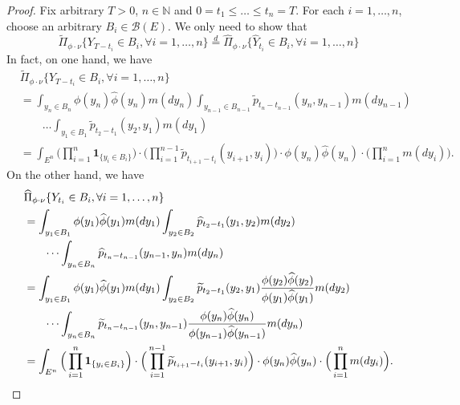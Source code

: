 \documentclass[12pt,a4paper]{amsart}
\numberwithin{equation}{section}
\theoremstyle{plain}
\theoremstyle{definition}
\begin{document}
\begin{proof}
	Fix arbitrary $T>0$, $n \in \mathbb N$ and $0= t_1\leq \dots \leq t_n = T$.
	For each $i=1,\dots, n$, choose an arbitrary $B_i \in \mathscr B(E)$.
	We only need to show that
  \[
    \widetilde \Pi_{\phi \cdot \nu}\{Y_{T-t_i}\in B_i,\forall i=1,\dots, n\}
    \overset{d}{=}\widehat \Pi_{\phi \cdot \nu}\{\widehat Y_{t_i}\in B_i,\forall i=1,\dots, n\}
  \]
	In fact, on one hand, we have
  \begin{align}
    &\widetilde \Pi_{\phi \cdot \nu}\{Y_{T-t_i}\in B_i,\forall i=1,\dots, n\}
    \\&= \int_{y_n\in B_n} \phi(y_n)\widehat\phi(y_n) m(dy_n)\int_{y_{n-1}\in B_{n-1}} \widetilde p_{t_n - t_{n-1}}(y_n,y_{n-1})m(dy_{n-1})
    \\& \qquad \dots \int_{y_1\in B_1} \widetilde p_{t_2 - t_1}(y_2,y_1)m(dy_1)
    \\&= \int_{E^n} \Big(\prod_{i=1}^n \mathbf 1_{\{y_i\in B_i\}}\Big)\cdot\Big(\prod_{i=1}^{n-1} \widetilde p_{t_{i+1}-t_i}(y_{i+1},y_i)\Big)\cdot\phi(y_n)\widehat\phi(y_n)\cdot \Big(\prod_{i=1}^nm(dy_i)\Big).
  \end{align}
	On the other hand, we have
  \begin{align}
    &\widehat \Pi_{\phi\cdot\nu}\{Y_{t_i}\in B_i, \forall i = 1,\dots, n\}
    \\&= \int_{y_1\in B_1} \phi(y_1)\widehat \phi(y_1)m(dy_1) \int_{y_2\in B_2} \widehat p_{t_2-t_1}(y_1,y_2)m(dy_2)
    \\&\qquad \dots\int_{y_n\in B_n}\widehat p_{t_n-t_{n-1}}(y_{n-1},y_n)m(dy_n)
    \\&= \int_{y_1\in  B_1} \phi(y_1)\widehat \phi(y_1)m(dy_1) \int_{y_2\in B_2} \widetilde p_{t_2-t_1}(y_2,y_1)\frac{\phi(y_2)\widehat \phi(y_2)}{\phi(y_1)\widehat \phi(y_1)}m(dy_2)
    \\&\qquad \dots\int_{y_n\in B_n}\widetilde p_{t_n-t_{n-1}}(y_n,y_{n-1})\frac{\phi(y_n)\widehat\phi(y_n)}{\phi(y_{n-1})\widehat\phi(y_{n-1})}m(dy_n)
    \\&= \int_{E^n} \Big(\prod_{i=1}^n \mathbf 1_{\{y_i\in B_i\}}\Big)\cdot\Big(\prod_{i=1}^{n-1} \widetilde p_{t_{i+1}-t_i}(y_{i+1},y_i)\Big)\cdot\phi(y_n)\widehat\phi(y_n)\cdot \Big(\prod_{i=1}^n m(dy_i)\Big).
    \qedhere
  \end{align}
\end{proof}
\end{document}

